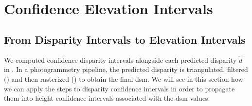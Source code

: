 \chapter{Confidence Elevation Intervals}\label{chap:elevation_intervals}
\section{From Disparity Intervals to Elevation Intervals}\label{sec:elevation_intervals}
We computed confidence disparity intervals alongside each predicted disparity $\tilde{d}$ in . In a photogrammetry pipeline, the predicted disparity is triangulated, filtered () and then rasterized () to obtain the final \acrshort{dsm}. We will see in this section how we can apply the steps to disparity confidence intervals in order to propagate them into height confidence intervals associated with the \acrshort{dsm} values.

